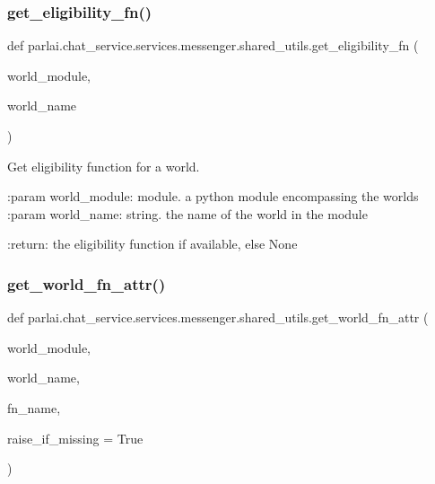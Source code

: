 \subsubsection{\texorpdfstring{get\+\_\+eligibility\+\_\+fn()}{get\_eligibility\_fn()}}
{\footnotesize\ttfamily def parlai.\+chat\+\_\+service.\+services.\+messenger.\+shared\+\_\+utils.\+get\+\_\+eligibility\+\_\+fn (\begin{DoxyParamCaption}\item[{}]{world\+\_\+module,  }\item[{}]{world\+\_\+name }\end{DoxyParamCaption})}

\begin{DoxyVerb}Get eligibility function for a world.

:param world_module:
    module. a python module encompassing the worlds
:param world_name:
    string. the name of the world in the module

:return:
    the eligibility function if available, else None
\end{DoxyVerb}
 \mbox{\label{namespaceparlai_1_1chat__service_1_1services_1_1messenger_1_1shared__utils_ade421ab07be47db0333a0fac599c07ef}} 
\subsubsection{\texorpdfstring{get\+\_\+world\+\_\+fn\+\_\+attr()}{get\_world\_fn\_attr()}}
{\footnotesize\ttfamily def parlai.\+chat\+\_\+service.\+services.\+messenger.\+shared\+\_\+utils.\+get\+\_\+world\+\_\+fn\+\_\+attr (\begin{DoxyParamCaption}\item[{}]{world\+\_\+module,  }\item[{}]{world\+\_\+name,  }\item[{}]{fn\+\_\+name,  }\item[{}]{raise\+\_\+if\+\_\+missing = {\ttfamily True} }\end{DoxyParamCaption})}

